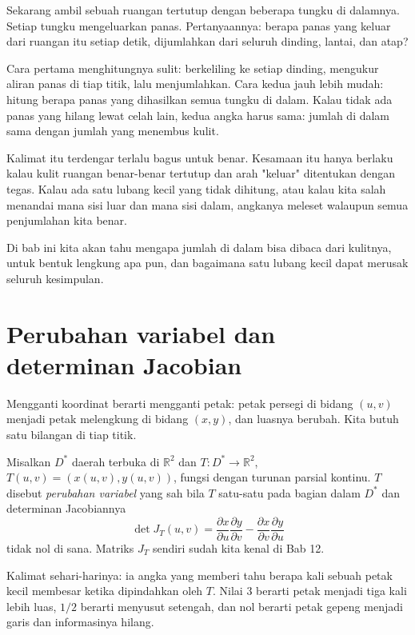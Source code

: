 \begin{untukanak}
Sekarang ambil sebuah ruangan tertutup dengan beberapa tungku di dalamnya.
Setiap tungku mengeluarkan panas. Pertanyaannya: berapa panas yang keluar dari
ruangan itu setiap detik, dijumlahkan dari seluruh dinding, lantai, dan atap?

Cara pertama menghitungnya sulit: berkeliling ke setiap dinding, mengukur aliran
panas di tiap titik, lalu menjumlahkan. Cara kedua jauh lebih mudah: hitung
berapa panas yang dihasilkan semua tungku di dalam. Kalau tidak ada panas yang
hilang lewat celah lain, kedua angka harus sama: jumlah di dalam sama dengan
jumlah yang menembus kulit.

Kalimat itu terdengar terlalu bagus untuk benar. Kesamaan itu hanya berlaku
kalau kulit ruangan benar-benar tertutup dan arah "keluar" ditentukan dengan tegas. Kalau ada satu lubang
kecil yang tidak dihitung, atau kalau kita salah menandai mana sisi luar dan
mana sisi dalam, angkanya meleset walaupun semua penjumlahan kita benar.

Di bab ini kita akan tahu mengapa jumlah di dalam bisa dibaca dari kulitnya,
untuk bentuk lengkung apa pun, dan bagaimana satu lubang kecil dapat merusak
seluruh kesimpulan.
\end{untukanak}

\section{Perubahan variabel dan determinan Jacobian}

Mengganti koordinat berarti mengganti petak: petak persegi di bidang $(u,v)$
menjadi petak melengkung di bidang $(x,y)$, dan luasnya berubah. Kita butuh
satu bilangan di tiap titik.

\begin{definisi}
 Misalkan $D^{*}$ daerah terbuka di
$\mathbb{R}^{2}$ dan $T\colon D^{*}\to\mathbb{R}^{2}$,
$T(u,v)=(x(u,v),y(u,v))$, fungsi dengan turunan parsial kontinu. $T$ disebut
\emph{perubahan variabel} yang sah bila $T$ satu-satu pada bagian dalam
$D^{*}$ dan determinan Jacobiannya
\[
\det J_{T}(u,v)=\frac{\partial x}{\partial u}\frac{\partial y}{\partial v}
-\frac{\partial x}{\partial v}\frac{\partial y}{\partial u}
\]
tidak nol di sana. Matriks $J_{T}$ sendiri sudah kita kenal di Bab 12.
\end{definisi}

Kalimat sehari-harinya: ia angka yang memberi tahu berapa kali sebuah petak
kecil membesar ketika dipindahkan oleh $T$. Nilai $3$ berarti petak menjadi tiga kali lebih luas, $1/2$ berarti menyusut
setengah, dan nol berarti petak gepeng menjadi garis dan informasinya hilang.

